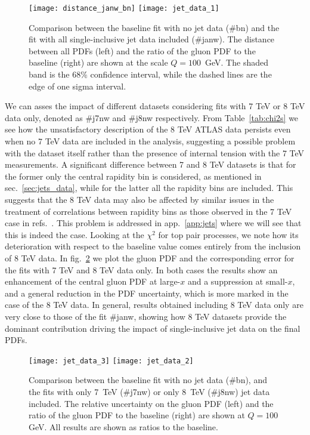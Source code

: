 \begin{figure}[!t]
    \centering
    \texttt{[image: distance\_janw\_bn]}
    \texttt{[image: jet\_data\_1]}\\
    \caption{ Comparison between the baseline fit with no jet data  (\#bn)
      and the fit with all single-inclusive jet data included (\#janw).
      The distance between all PDFs
      (left) and the ratio of the gluon PDF to the baseline (right) are shown at the scale
      $Q=100$~GeV. The shaded band is the 68\% confidence interval,
      while the dashed lines are the edge of one sigma interval.}
    \label{fig:jet_data_total}
\end{figure}

%
We can asses the impact of different datasets considering fits with 7 TeV or 8 TeV data only, denoted as \#j7nw and \#j8nw
respectively. From Table~\ref{tab:chi2s} we see how the unsatisfactory description of the 8 TeV ATLAS data persists even when 
no 7 TeV data are included in the analysis, suggesting a possible problem with the dataset itself rather than 
the presence of internal tension with the 7 TeV measurements.
A significant difference between 7 and 8 TeV datasets is that for the former only the central rapidity bin is considered,
as mentioned in sec.~\ref{sec:jets_data}, while for the latter all the rapidity bins are included.
This suggests that the 8 TeV data may also be affected by similar issues in the treatment of correlations 
between rapidity bins as those observed in the 7 TeV case in refs.~\cite{Ball:2017nwa}. This problem is addressed
in app.~\ref{app:jets} where we will see that this is indeed the case.
%
Looking at the $\chi^2$ for top pair processes, we note how its deterioration with respect to the baseline value comes
entirely from the inclusion of 8 TeV data.
In fig.~\ref{fig:jet_data_partial}
we plot the gluon PDF and the corresponding error for the fits with 7 TeV and 8 TeV data only. In both cases the results show 
an enhancement of the central gluon PDF at large-$x$ and a suppression at small-$x$, and a general reduction in the 
PDF uncertainty, which is more marked in the case of the 8 TeV data. 
In general, results obtained including 8 TeV data only are very close to those of the fit \#janw, showing
how 8 TeV datasets provide the dominant contribution driving the impact of single-inclusive jet data on the final PDFs.

\begin{figure}[!t]
    \centering
    \texttt{[image: jet\_data\_3]}
    \texttt{[image: jet\_data\_2]}
    \caption{ Comparison between the baseline fit with no jet data
      (\#bn), and the fits with only 7~TeV (\#j7nw) or only 8~TeV (\#j8nw)
      jet data included. The relative uncertainty on the gluon PDF (left)
      and the ratio of the gluon PDF to the baseline (right) are shown at
      $Q=100$ GeV. All results are shown as ratios to the baseline.}
    \label{fig:jet_data_partial}
\end{figure}

